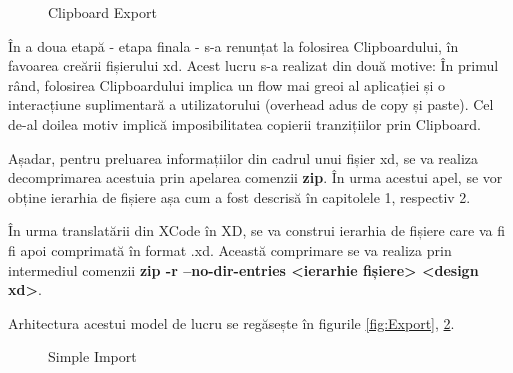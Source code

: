 \begin{figure}[!htbp]
\centering
{}
\caption{Clipboard Export} \label{fig:Clipboard Export}
\end{figure}


În a doua etapă - etapa finala - s-a renunțat la folosirea Clipboardului, în favoarea creării fișierului xd. 
Acest lucru s-a realizat din două motive: În primul rând, folosirea Clipboardului implica un flow mai greoi al aplicației și o interacțiune suplimentară a utilizatorului (overhead adus de copy și paste). Cel de-al doilea motiv implică imposibilitatea copierii tranzițiilor prin Clipboard.

Așadar, pentru preluarea informațiilor din cadrul unui fișier xd, se va realiza decomprimarea acestuia prin apelarea comenzii \textbf{zip}. În urma acestui apel, se vor obține ierarhia de fișiere așa cum a fost descrisă în capitolele 1, respectiv 2.

În urma translatării din XCode în XD, se va construi ierarhia de fișiere care va fi fi apoi comprimată în format .xd. Această comprimare se va realiza prin intermediul comenzii \textbf{zip -r --no-dir-entries <ierarhie fișiere> <design xd>}.

Arhitectura acestui model de lucru se regăsește în figurile \ref{fig:Export}, \ref{fig:Import}.

\begin{figure}[!htbp]
\centering
{}
\caption{Simple Import} \label{fig:Import}
\end{figure}

